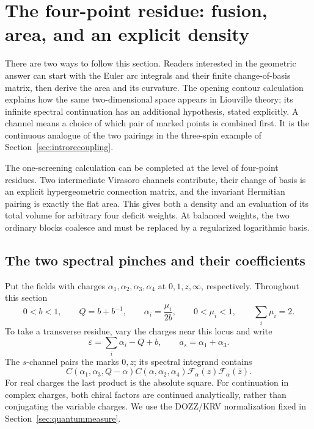 \section{The four-point residue: fusion, area, and an explicit density}
\label{sec:screenedfusion}

There are two ways to follow this section. Readers interested in
the geometric answer can start with the Euler arc integrals and
their finite change-of-basis matrix, then derive the area and its
curvature. The opening contour calculation explains how the same
two-dimensional space appears in Liouville theory; its infinite
spectral continuation has an additional hypothesis, stated explicitly.
A channel means a choice of which pair of marked points is combined
first. It is the continuous analogue of the two pairings in the
three-spin example of Section~\ref{sec:introrecoupling}.

The one-screening calculation can be completed at the level of
four-point residues. Two intermediate Virasoro channels contribute,
their change of basis is an explicit hypergeometric connection
matrix, and the invariant Hermitian pairing is exactly the flat
area. This gives both a density and an evaluation of its total
volume for arbitrary four deficit weights. At balanced weights,
the two ordinary blocks coalesce and must be replaced by a
regularized logarithmic basis.

\subsection{The two spectral pinches and their coefficients}

Put the fields with charges $\alpha_1,\alpha_2,\alpha_3,\alpha_4$
at $0,1,z,\infty$, respectively. Throughout this section
\begin{equation}
 0<b<1,\qquad Q=b+b^{-1},\qquad
 \alpha_i=\frac{\mu_i}{2b},\qquad
 0<\mu_i<1,\qquad \sum_i\mu_i=2.
 \label{eq:screeningparameters}
\end{equation}
To take a transverse residue, vary the charges near this locus
and write
\begin{equation}
 \varepsilon=\sum_i\alpha_i-Q+b,\qquad
 a_s=\alpha_1+\alpha_3.
 \label{eq:screeningtransverse}
\end{equation}
The $s$-channel pairs the marks $0,z$; its spectral integrand
contains
\[
 C(\alpha_1,\alpha_3,Q-\alpha)
 C(\alpha,\alpha_2,\alpha_4)
 \mathcal F_\alpha(z)\mathcal F_\alpha(\bar z).
\]
For real charges the last product is the absolute square.
For continuation in complex charges, both chiral factors are
continued analytically, rather than conjugating the variable
charges. We use the DOZZ/KRV normalization fixed in
Section~\ref{sec:quantummeasure}.

